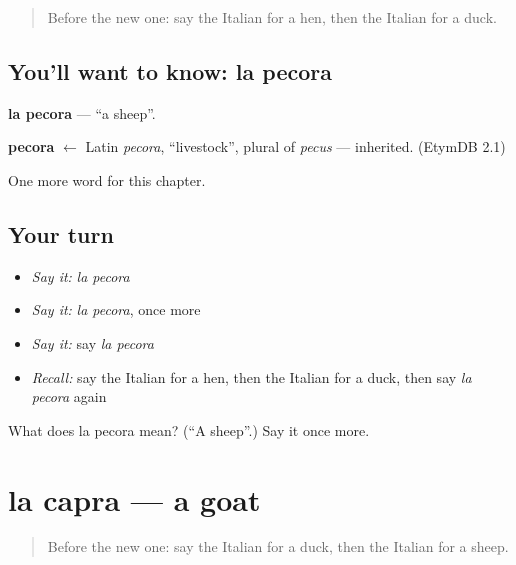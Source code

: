\label{lesson:IT-C70-pecora}



\begin{quote}
Before the new one: say the Italian for a hen, then the Italian for a duck.
\end{quote}

\subsection*{You'll want to know: la pecora}
\textbf{la pecora} — \textquotedblleft{}a sheep\textquotedblright{}.

\begin{cousinweb}
\textbf{pecora} $\leftarrow$ Latin \emph{pecora}, \textquotedblleft{}livestock\textquotedblright{}, plural of \emph{pecus} — inherited. (EtymDB 2.1)
\end{cousinweb}

\begin{grammarlens}[title={What you've built}]
One more word for this chapter.
\end{grammarlens}

\subsection*{Your turn}
\begin{itemize}
\raggedright
  \item \emph{Say it:} \emph{la pecora}
  \item \emph{Say it:} \emph{la pecora}, once more
  \item \emph{Say it:} say \emph{la pecora}
  \item \emph{Recall:} say the Italian for a hen, then the Italian for a duck, then say \emph{la pecora} again
\end{itemize}

\begin{tcolorbox}[breakable,colback=teal!4,colframe=teal!35!black,title={Before you move on}]
What does la pecora mean? (\textquotedblleft{}A sheep\textquotedblright{}.) Say it once more.
\end{tcolorbox}
\section[la capra]{la capra — a goat}

\label{lesson:IT-C70-capra}



\begin{quote}
Before the new one: say the Italian for a duck, then the Italian for a sheep.
\end{quote}

